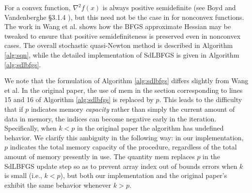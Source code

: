 \documentclass{article}
\newcommand{\RR}{\mathbb{R}}
\DeclarePairedDelimiter{\ip}{\langle}{\rangle}
\newcommand{\trans}{{}^{\top}}
\begin{document}
For a convex function, $\nabla^2 f(x)$ is always positive semidefinite (see Boyd
and Vandenberghe \S 3.1.4 \cite{boyd}), but this need not be the case in for
nonconvex functions. The work in Wang et al.  \cite{sdlbfgs} shows how the BFGS
approximate Hessian may be tweaked to ensure that positive semidefiniteness is
preserved even in nonconvex cases. The overall stochastic quasi-Newton method is
described in Algorithm \ref{alg:sqn}, while the detailed implementation of
SdLBFGS is given in Algorithm \ref{alg:sdlbfgs}.

We note that the formulation of Algorithm \ref{alg:sdlbfgs} differs slightly
from Wang et al. In the original paper, the use of $\textrm{mem}$ in the section
corresponding to lines 15 and 16 of Algorithm \ref{alg:sdlbfgs} is replaced by
$p$. This leads to the difficulty that if $p$ indicates memory \emph{capacity}
rather than simply the current amount of data in memory, the indices can become
negative early in the iteration. Specifically, when $k < p$ in the original
paper the algorithm has undefined behavior. We clarify this ambiguity in the
following way: in our implementation, $p$ indicates the total memory capacity of
the procedure, regardless of the total amount of memory presently in use. The
quantity $\textrm{mem}$ replaces $p$ in the SdLBFGS update step so as to prevent
array index out of bounds errors when $k$ is small (i.e., $k < p$), but both our
implementation and the original paper's exhibit the same behavior whenever $k >
p$.

\begin{algorithm}
  \begin{algorithmic}[1]
    \State{$\Delta x_k, s_{k-1}, \bar{y}_{k-1}, \rho_{k-1} \leftarrow
    \textsc{SdLBFGS}(g_k, {}^*(\textrm{data}\trans))$} 
    \EndIf
    \EndFor
    \EndFunction
  \end{algorithmic}
  \label{alg:sqn}
  \caption{%
    The high level stochastic quasi-Newton minimization algorithm. Given an
    initial point $x_1 \in \RR^n$, batch sizes $\ip{m_k}$, step sizes
    $\ip{\alpha_k}$, and a maximum memory capacity $p$, perform BFGS with the
    stochastic dampened direction update.
  }
\end{algorithm}
\end{document}
